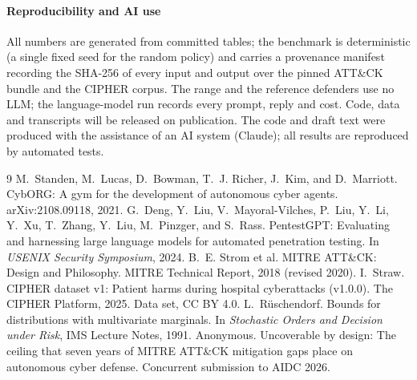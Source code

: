 \documentclass[conference,compsoc]{IEEEtran}
\begin{document}
\paragraph{Reproducibility and AI use} All numbers are generated from committed tables; the
benchmark is deterministic (a single fixed seed for the random policy) and carries a
provenance manifest recording the SHA-256 of every input and output over the pinned
ATT\&CK bundle and the CIPHER corpus. The range and the reference defenders use no LLM;
the language-model run records every prompt, reply and cost. Code, data and transcripts
will be released on publication. The code and draft text
were produced with the assistance of an AI system (Claude); all results are reproduced
by automated tests.

\begin{thebibliography}{9}
 M.~Standen, M.~Lucas, D.~Bowman, T.~J. Richer, J.~Kim, and
D.~Marriott.
\newblock CybORG: A gym for the development of autonomous cyber agents.
\newblock arXiv:2108.09118, 2021.
 G.~Deng, Y.~Liu, V.~Mayoral-Vilches, P.~Liu, Y.~Li, Y.~Xu,
T.~Zhang, Y.~Liu, M.~Pinzger, and S.~Rass.
\newblock PentestGPT: Evaluating and harnessing large language models for automated
penetration testing.
\newblock In \emph{USENIX Security Symposium}, 2024.
 B.~E. Strom et al.
\newblock MITRE ATT\&CK: Design and Philosophy.
\newblock MITRE Technical Report, 2018 (revised 2020).
 I.~Straw.
\newblock CIPHER dataset v1: Patient harms during hospital cyberattacks (v1.0.0).
\newblock The CIPHER Platform, 2025. Data set, CC BY 4.0.
 L.~R\"uschendorf.
\newblock Bounds for distributions with multivariate marginals.
\newblock In \emph{Stochastic Orders and Decision under Risk}, IMS Lecture Notes, 1991.
 Anonymous.
\newblock Uncoverable by design: The ceiling that seven years of MITRE ATT\&CK
mitigation gaps place on autonomous cyber defense.
\newblock Concurrent submission to AIDC 2026.
\end{thebibliography}
\end{document}
